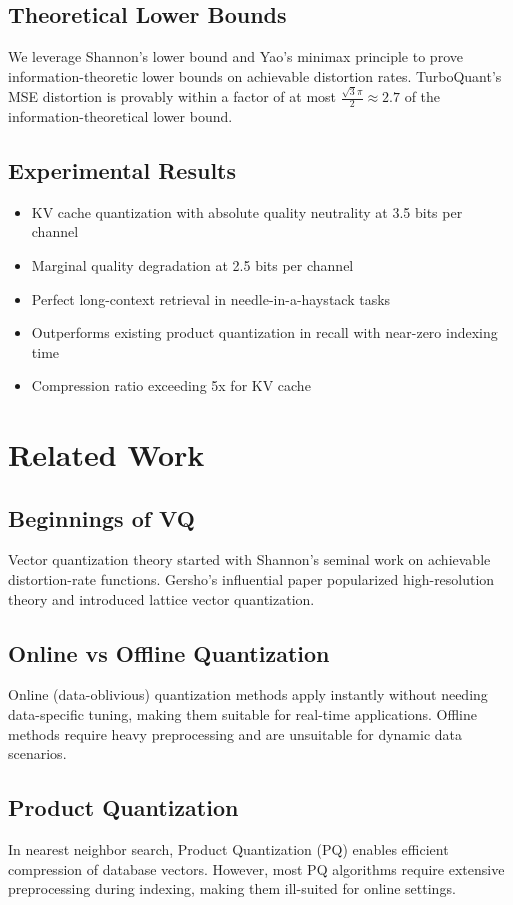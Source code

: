 \documentclass[11pt]{article}
\begin{document}
\subsection{Theoretical Lower Bounds}
We leverage Shannon's lower bound and Yao's minimax principle to prove information-theoretic lower bounds on achievable distortion rates. TurboQuant's MSE distortion is provably within a factor of at most $\frac{\sqrt{3}\pi}{2} \approx 2.7$ of the information-theoretical lower bound.

\subsection{Experimental Results}
\begin{itemize}
    \item KV cache quantization with absolute quality neutrality at 3.5 bits per channel
    \item Marginal quality degradation at 2.5 bits per channel
    \item Perfect long-context retrieval in needle-in-a-haystack tasks
    \item Outperforms existing product quantization in recall with near-zero indexing time
    \item Compression ratio exceeding 5x for KV cache
\end{itemize}

\section{Related Work}

\subsection{Beginnings of VQ}
Vector quantization theory started with Shannon's seminal work on achievable distortion-rate functions. Gersho's influential paper popularized high-resolution theory and introduced lattice vector quantization.

\subsection{Online vs Offline Quantization}
Online (data-oblivious) quantization methods apply instantly without needing data-specific tuning, making them suitable for real-time applications. Offline methods require heavy preprocessing and are unsuitable for dynamic data scenarios.

\subsection{Product Quantization}
In nearest neighbor search, Product Quantization (PQ) enables efficient compression of database vectors. However, most PQ algorithms require extensive preprocessing during indexing, making them ill-suited for online settings.
\end{document}
